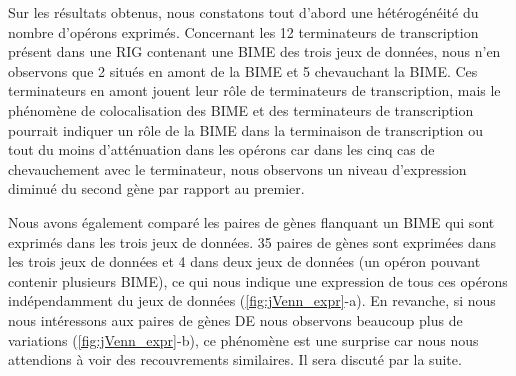 \documentclass[12pt,a4paper]{report}
\begin{document}
\begin{onehalfspace}
Sur les résultats obtenus, nous constatons tout d'abord une hétérogénéité du nombre d'opérons exprimés. Concernant les 12 terminateurs de transcription présent dans une RIG contenant une BIME des trois jeux de données, nous n'en observons que 2 situés en amont de la BIME et 5 chevauchant la BIME. Ces terminateurs en amont jouent leur rôle de terminateurs de transcription, mais le phénomène de colocalisation des BIME et des terminateurs de transcription pourrait indiquer un rôle de la BIME dans la terminaison de transcription ou tout du moins d'atténuation dans les opérons car dans les cinq cas de chevauchement avec le terminateur, nous observons un niveau d'expression diminué du second gène par rapport au premier.

\begin{figure}
\end{figure}

Nous avons également comparé les paires de gènes flanquant un BIME qui sont exprimés dans les trois jeux de données. 35 paires de gènes sont exprimées dans les trois jeux de données et 4 dans deux jeux de données (un opéron pouvant contenir plusieurs BIME), ce qui nous indique une expression de tous ces opérons indépendamment du jeux de données (\autoref{fig:jVenn_expr}-a). En revanche, si nous nous intéressons aux paires de gènes DE nous observons beaucoup plus de variations (\autoref{fig:jVenn_expr}-b), ce phénomène est une surprise car nous nous attendions à voir des recouvrements similaires. Il sera discuté par la suite.


\end{onehalfspace}
\end{document}
